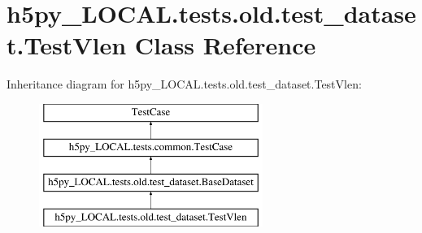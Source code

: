 \hypertarget{classh5py__LOCAL_1_1tests_1_1old_1_1test__dataset_1_1TestVlen}{}\section{h5py\+\_\+\+L\+O\+C\+A\+L.\+tests.\+old.\+test\+\_\+dataset.\+Test\+Vlen Class Reference}
\label{classh5py__LOCAL_1_1tests_1_1old_1_1test__dataset_1_1TestVlen}
Inheritance diagram for h5py\+\_\+\+L\+O\+C\+A\+L.\+tests.\+old.\+test\+\_\+dataset.\+Test\+Vlen\+:\begin{figure}[H]
\begin{center}
\leavevmode
\includegraphics[height=4.000000cm]{classh5py__LOCAL_1_1tests_1_1old_1_1test__dataset_1_1TestVlen}
\end{center}
\end{figure}
